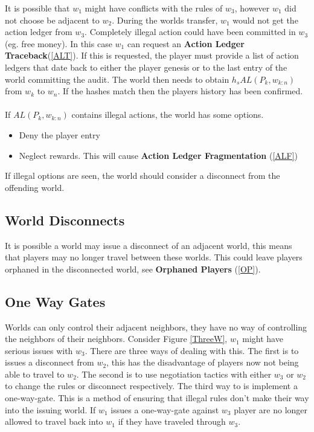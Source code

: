 \documentclass[runningheads,a4paper]{llncs}
\begin{document}
It is possible that $w_1$ might have conflicts with the rules of $w_3$, however $w_1$ did not choose be adjacent to $w_2$. During the worlds transfer, $w_1$ would not get the action ledger from $w_3$. Completely illegal action could have been committed in $w_3$ (eg. free money). In this case $w_1$ can request an \textbf{Action Ledger Traceback}(\ref{ALT}). If this is requested, the player must provide a list of action ledgers that date back to either the player genesis or to the last entry of the world committing the audit. The world then needs to obtain $h_s{AL(P_k, w_{k:n})}$ from $w_k$ to $w_n$. If the hashes match then the players history has been confirmed. 
\\\\
If $AL(P_k, w_{k:n})$ contains illegal actions, the world has some options.

\begin{itemize}
\item Deny the player entry 
\item Neglect rewards. This will cause \textbf{Action Ledger Fragmentation} (\ref{ALF}) 
\end{itemize}

If illegal options are seen, the world should consider a disconnect from the offending world.

\subsection{World Disconnects}
\label{WD}
It is possible a world may issue a disconnect of an adjacent world, this means that players may no longer travel between these worlds. This could leave players orphaned in the disconnected world, see \textbf{Orphaned Players} (\ref{OP}).




\subsection{One Way Gates} %
Worlds can only control their adjacent neighbors, they have no way of controlling the neighbors of their neighbors. Consider Figure \ref{ThreeW}, $w_1$ might have serious issues with $w_3$. There are three ways of dealing with this. The first is to issues a disconnect from $w_2$, this has the disadvantage of players now not being able to travel to $w_2$. The second is to use negotiation tactics with either $w_3$ or $w_2$ to change the rules or disconnect respectively. The third way to is implement a one-way-gate. This is a method of ensuring that illegal rules don't make their way into the issuing world. If $w_1$ issues a one-way-gate against $w_3$ player are no longer allowed to travel back into $w_1$ if they have traveled through $w_3$.
\end{document}
